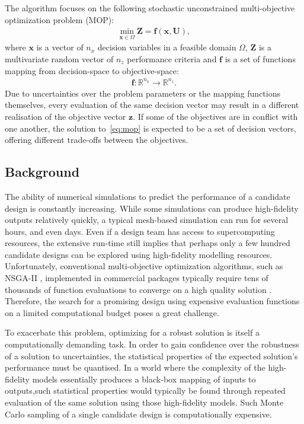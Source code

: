 \documentclass[10pt]{llncs}
\newcommand{\brr}[1]{{\left({#1}\right)}} %
\newcommand{\vx}{\mathbf{x}} %
\newcommand{\vf}{\mathbf{f}} %
\newcommand{\vz}{\mathbf{z}} %
\newcommand{\vZ}{\mathbf{Z}} %
\newcommand{\vU}{\mathbf{U}} %
\begin{document}
The algorithm focuses on the following stochastic unconstrained multi-objective optimization problem (MOP):
\begin{align}
\label{eq:mop}
	\min_{\vx\in\Omega} \vZ=\vf\brr{\vx, \vU},
\end{align}
where $\vx$ is a vector of $n_x$ decision variables in a feasible domain $\Omega$, $\vZ$ is a multivariate random vector of $n_z$ performance criteria and $\vf$ is a set of functions mapping from decision-space to objective-space:
\begin{align}
	\vf: \mathbb{R}^{n_x} \rightarrow \mathbb{R}^{n_z}.
\end{align}
Due to uncertainties over the problem parameters or the mapping functions themselves, every evaluation of the same decision vector may result in a different realisation of the objective vector $\vz$.
If some of the objectives are in conflict with one another, the solution to~\eqref{eq:mop} is expected to be a set of decision vectors, offering different trade-offs between the objectives.

\subsection{\label{sec:intro}Background}

The ability of numerical simulations to predict the performance of a candidate
design is constantly increasing. While some simulations can produce high-fidelity outputs relatively quickly, a typical mesh-based simulation can run for several hours, and even days. Even if a design team has access to supercomputing resources, the extensive run-time still implies that perhaps only a few hundred candidate designs can be explored using high-fidelity modelling resources. Unfortunately, conventional multi-objective optimization algorithms,
such as NSGA-II \cite{deb2002fast}, implemented in commercial packages typically require tens
of thousands of function evaluations to converge on a high quality solution \cite{hansen2010comparing,zhou2011multiobjective}. Therefore, the search for a promising design using expensive evaluation functions on a limited computational budget poses a great challenge.

To exacerbate this problem, optimizing for a robust solution is itself a computationally
demanding task. In order to gain confidence over the robustness of a solution to uncertainties, the statistical properties of the expected solution's performance must be quantised. In a world where the complexity of the high-fidelity models essentially produces a black-box mapping of inputs to outputs,such statistical properties would typically be found through repeated evaluation of the same solution using those high-fidelity models. Such Monte Carlo
sampling of a single candidate design is computationally expensive.
\end{document}
